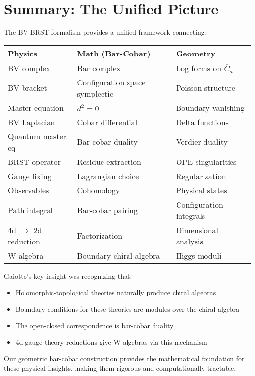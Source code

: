\section{Summary: The Unified Picture}

\begin{remark}[Summary]
The BV-BRST formalism provides a unified framework connecting:

\begin{center}
\begin{tabular}{|l|l|l|}
\hline
\textbf{Physics} & \textbf{Math (Bar-Cobar)} & \textbf{Geometry} \\
\hline
BV complex & Bar complex & Log forms on $\overline{C}_n$ \\
BV bracket & Configuration space symplectic & Poisson structure \\
Master equation & $d^2 = 0$ & Boundary vanishing \\
BV Laplacian & Cobar differential & Delta functions \\
Quantum master eq & Bar-cobar duality & Verdier duality \\
BRST operator & Residue extraction & OPE singularities \\
Gauge fixing & Lagrangian choice & Regularization \\
Observables & Cohomology & Physical states \\
Path integral & Bar-cobar pairing & Configuration integrals \\
4d $\to$ 2d reduction & Factorization & Dimensional analysis \\
W-algebra & Boundary chiral algebra & Higgs moduli \\
\hline
\end{tabular}
\end{center}
\end{remark}

\begin{remark}
Gaiotto's key insight was recognizing that:
\begin{itemize}
\item Holomorphic-topological theories naturally produce chiral algebras
\item Boundary conditions for these theories are modules over the chiral algebra
\item The open-closed correspondence is bar-cobar duality
\item 4d gauge theory reductions give W-algebras via this mechanism
\end{itemize}

Our geometric bar-cobar construction provides the mathematical foundation for 
these physical insights, making them rigorous and computationally tractable.
\end{remark}

